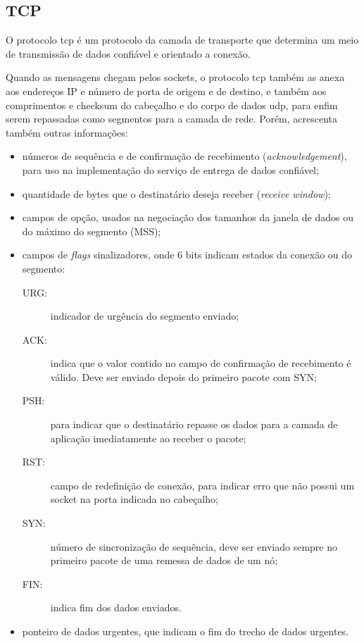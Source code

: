 
\subsection*{TCP}

O protocolo \gls*{tcp} é um protocolo da camada de transporte que determina um meio de
transmissão de dados confiável e orientado a conexão.

Quando as mensagens chegam pelos \glspl*{socket}, o protocolo \gls*{tcp} também as anexa
aos endereços IP e número de porta de origem e de destino, e também aos comprimentos e
\gls*{checksum} do cabeçalho e do corpo de dados \gls*{udp}, para enfim serem repassadas
como segmentos para a camada de rede. Porém, acrescenta também outras informações:

\begin{itemize}
    \item números de sequência e de confirmação de recebimento (\emph{acknowledgement}),
        para uso na implementação do serviço de entrega de dados confiável;

    \item quantidade de bytes que o destinatário deseja receber (\emph{receive window});

    \item campos de opção, usados na negociação dos tamanhos da janela de dados ou do
        máximo do segmento (MSS);

    \item campos de \emph{flags} sinalizadores, onde 6 bits indicam estados da conexão
        ou do segmento:
        \begin{description}
            \item[URG:] indicador de urgência do segmento enviado;

            \item[ACK:] indica que o valor contido no campo de confirmação de
                recebimento é válido. Deve ser enviado depois do primeiro pacote com
                SYN;

            \item[PSH:] para indicar que o destinatário repasse os dados para a camada
                de aplicação imediatamente ao receber o pacote;

            \item[RST:] campo de redefinição de conexão, para indicar erro que não
                possui um \gls*{socket} na porta indicada no cabeçalho;

            \item[SYN:] número de sincronização de sequência, deve ser enviado sempre
                no primeiro pacote de uma remessa de dados de um nó;

            \item[FIN:] indica fim dos dados enviados.
        \end{description}

    \item ponteiro de dados urgentes, que indicam o fim do trecho de dados urgentes.
\end{itemize}


